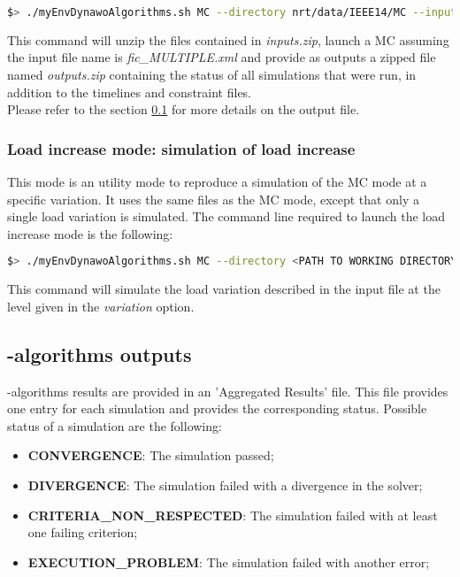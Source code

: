 \documentclass[a4paper, 12pt]{report}
\begin{document}
\begin{lstlisting}[language=bash, breaklines=true, breakatwhitespace=false]
$> ./myEnvDynawoAlgorithms.sh MC --directory nrt/data/IEEE14/MC --input inputs.zip --output outputs.zip
\end{lstlisting}

This command will unzip the files contained in \textit{inputs.zip}, launch a MC assuming the input file name is \textit{fic\_MULTIPLE.xml}
and provide as outputs a zipped file named \textit{outputs.zip} containing the status of all simulations that were run, 
in addition to the timelines and constraint files.\\

Please refer to the section \ref{Dynawo_algorithms_Outputs_AggrResults} for more details on the output file.

\subsubsection{Load increase mode: simulation of load increase}

This mode is an utility mode to reproduce a simulation of the MC mode at a specific variation.
It uses the same files as the MC mode, except that only a single load variation is simulated.
The command line required to launch the load increase mode is the following:

\begin{lstlisting}[language=bash, breaklines=true, breakatwhitespace=false]
$> ./myEnvDynawoAlgorithms.sh MC --directory <PATH TO WORKING DIRECTORY> --input <NAME OF INPUT FILE> --output <NAME OF OUTPUT FILE> --variation <VALUE BETWEEN 0 AND 100>
\end{lstlisting}

This command will simulate the load variation described in the input file at the level given in the \textit{variation} option.

\subsection[Dynawo-algorithms outputs]{\Dynawo-algorithms outputs}
\label{Dynawo_algorithms_Outputs_AggrResults}

\Dynawo-algorithms results are provided in an 'Aggregated Results' file. This file provides one entry for each simulation and provides the corresponding status.
Possible status of a simulation are the following:
\begin{itemize}
  \item \textbf{CONVERGENCE}: The simulation passed;
  \item \textbf{DIVERGENCE}: The simulation failed with a divergence in the solver;
  \item \textbf{CRITERIA\_NON\_RESPECTED}: The simulation failed with at least one failing criterion;
  \item \textbf{EXECUTION\_PROBLEM}: The simulation failed with another error;
\end{itemize}
\end{document}
